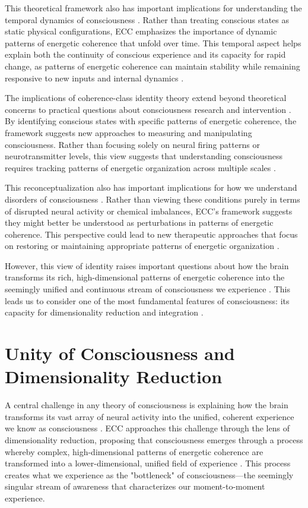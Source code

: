 \begin{refsection}
This theoretical framework also has important implications for understanding the temporal dynamics of consciousness \cite{craver2007explaining}. Rather than treating conscious states as static physical configurations, ECC emphasizes the importance of dynamic patterns of energetic coherence that unfold over time. This temporal aspect helps explain both the continuity of conscious experience and its capacity for rapid change, as patterns of energetic coherence can maintain stability while remaining responsive to new inputs and internal dynamics \cite{feigl1967mental}.

The implications of coherence-class identity theory extend beyond theoretical concerns to practical questions about consciousness research and intervention \cite{richardson2008multiple}. By identifying conscious states with specific patterns of energetic coherence, the framework suggests new approaches to measuring and manipulating consciousness. Rather than focusing solely on neural firing patterns or neurotransmitter levels, this view suggests that understanding consciousness requires tracking patterns of energetic organization across multiple scales \cite{bechtel1999multiple}.

This reconceptualization also has important implications for how we understand disorders of consciousness \cite{shapiro2000multiple}. Rather than viewing these conditions purely in terms of disrupted neural activity or chemical imbalances, ECC's framework suggests they might better be understood as perturbations in patterns of energetic coherence. This perspective could lead to new therapeutic approaches that focus on restoring or maintaining appropriate patterns of energetic organization \cite{wilson2001two}.

However, this view of identity raises important questions about how the brain transforms its rich, high-dimensional patterns of energetic coherence into the seemingly unified and continuous stream of consciousness we experience \cite{kim1992multiple}. This leads us to consider one of the most fundamental features of consciousness: its capacity for dimensionality reduction and integration \cite{lewis1966argument}.

\section{Unity of Consciousness and Dimensionality Reduction}

A central challenge in any theory of consciousness is explaining how the brain transforms its vast array of neural activity into the unified, coherent experience we know as consciousness \cite{tononi2016integrated}. ECC approaches this challenge through the lens of dimensionality reduction, proposing that consciousness emerges through a process whereby complex, high-dimensional patterns of energetic coherence are transformed into a lower-dimensional, unified field of experience \cite{baars2002conscious}. This process creates what we experience as the "bottleneck" of consciousness—the seemingly singular stream of awareness that characterizes our moment-to-moment experience.


\end{refsection}
